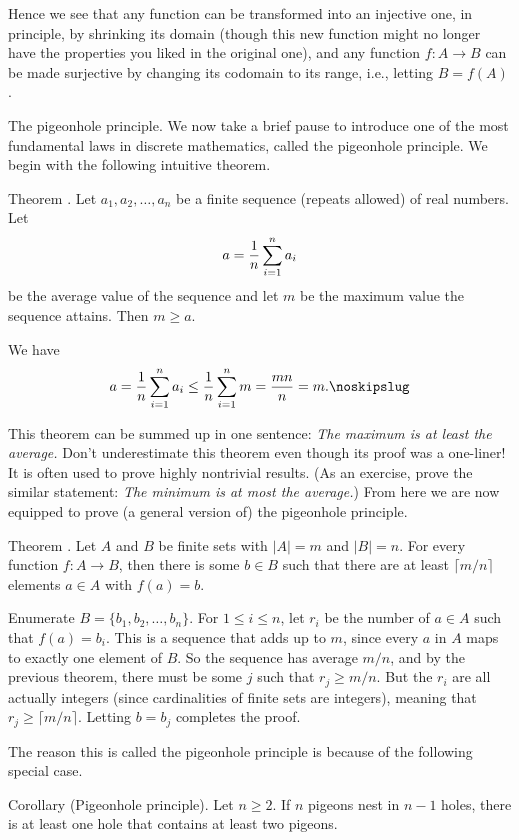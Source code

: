 Hence we see that any function can be transformed into an injective one, in principle, by shrinking its
domain (though this new function might no longer have the properties you liked in the original one),
and any function $f:A\to B$ can be made surjective by changing its codomain to its range, i.e.,
letting $B = f(A)$.

\medskip\boldlabel The pigeonhole principle. We now take a brief pause to introduce one of
the most fundamental laws in discrete mathematics, called the pigeonhole principle.
We begin with the following intuitive theorem.

\proclaim Theorem \advthm. Let $a_1, a_2, \ldots, a_n$ be a finite sequence (repeats allowed) of
real numbers. Let
$$a = {1\over n}\sum_{i=1}^n a_i$$
be the average value of the sequence and let $m$ be the maximum value the sequence attains. Then $m \ge a$.

\proof We have
$$a = {1\over n}\sum_{i=1}^n a_i \le {1\over n} \sum_{i=1}^n m = {mn\over n} = m.\noskipslug$$

This theorem can be summed up in one sentence: {\sl The maximum is at least the average.}
Don't underestimate this theorem even though its proof was a one-liner! It is often used to prove
highly nontrivial results.
(As an exercise, prove the similar statement: {\sl The minimum is at most the average.})
From here we are now equipped to prove (a general version of) the pigeonhole principle.

\edef\thmgeneralpigeonhole{\the\thmcount}
\proclaim Theorem \advthm. Let $A$ and $B$ be finite sets with $|A| = m$ and $|B|=n$.
For every function $f:A\to B$, then there is some $b\in B$ such that there are at least
$\lceil m/n\rceil$ elements $a\in A$ with $f(a) = b$.

\proof Enumerate $B = \{b_1, b_2, \ldots, b_n\}$. For $1\le i \le n$, let $r_i$ be the number of $a\in A$
such that $f(a) = b_i$. This is a sequence that adds up to $m$, since every $a$ in $A$ maps to
exactly one element of $B$. So the sequence has average $m/n$, and by the previous theorem,
there must be some $j$ such that $r_j \ge m/n$. But the $r_i$ are all actually integers (since
cardinalities of finite sets are integers), meaning that $r_j \ge \lceil m/n \rceil$. Letting
$b = b_j$ completes the proof.\slug

The reason this is called the pigeonhole principle is because of the following special case.

\parenproclaim Corollary {\advthm} (Pigeonhole principle). Let $n\ge 2$. If $n$ pigeons nest in $n-1$ holes,
there is at least one hole that contains at least two pigeons.

